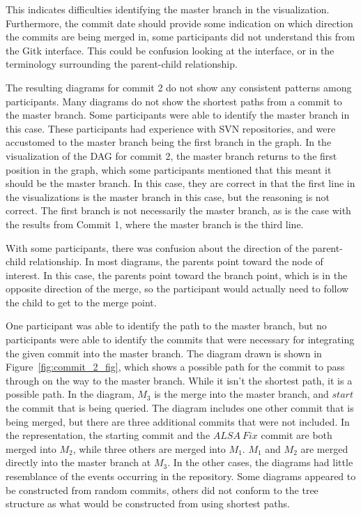 This indicates difficulties identifying the master branch in the
visualization. Furthermore, the commit date should provide some
indication on which direction the commits are being merged in, some
participants did not understand this from the Gitk interface. This could
be confusion looking at the interface, or in the terminology surrounding
the parent-child relationship.

The resulting diagrams for commit 2 do not show any consistent patterns
among participants. Many diagrams do not show the shortest paths from a
commit to the master branch. Some participants were able to identify the
master branch in this case. These participants had experience with SVN
repositories, and were accustomed to the master branch being the first
branch in the graph. In the visualization of the DAG for commit 2, the
master branch returns to the first position in the graph, which some
participants mentioned that this meant it should be the master branch.
In this case, they are correct in that the first line in the
visualizations is the master branch in this case, but the reasoning
is not correct.
The first branch is not necessarily the master branch,
as is the case with
the results from Commit 1, where the master branch is the third line.


With some participants, there was confusion about the direction of the
parent-child relationship. In most diagrams, the parents point
toward the node of interest. In this case, the parents point toward the
branch point, which is in the opposite direction of the merge, so the
participant would actually need to follow the child to get to the merge
point.

One participant was able to identify the path to the master branch, but
no participants were able to identify the commits that were necessary
for integrating the given commit into the master branch. The diagram
drawn is shown in Figure~\ref{fig:commit_2_fig}, which shows a possible
path for the commit to pass through on the way to the master branch.
While it isn't the shortest path, it is a possible path. In the diagram,
$M_3$ is the merge into the master branch, and $start$ the commit that
is being queried. The diagram includes one other commit that is being
merged, but there are three additional commits that were not included.
In the \mt{} representation, the starting commit and the $ALSA\ Fix$
commit are both merged into $M_2$, while three others are merged into
$M_1$. $M_1$ and $M_2$ are merged directly into the master branch at
$M_3$. In the other cases, the diagrams had little resemblance of the
events occurring in the repository. Some diagrams appeared to be
constructed from random commits, others did not conform to the tree
structure as what would be constructed from using shortest paths.

